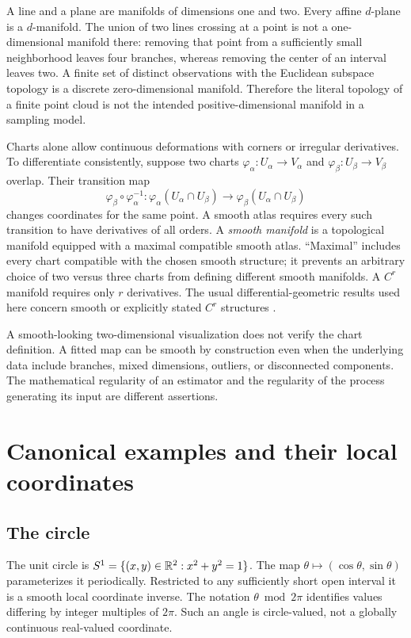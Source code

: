\begin{example}
A line and a plane are manifolds of dimensions one and two. Every affine $d$-plane is a $d$-manifold. The union of two lines crossing at a point is not a one-dimensional manifold there: removing that point from a sufficiently small neighborhood leaves four branches, whereas removing the center of an interval leaves two. A finite set of distinct observations with the Euclidean subspace topology is a discrete zero-dimensional manifold. Therefore the literal topology of a finite point cloud is not the intended positive-dimensional manifold in a sampling model.
\end{example}

Charts alone allow continuous deformations with corners or irregular derivatives. To differentiate consistently, suppose two charts $\varphi_\alpha:U_\alpha\to V_\alpha$ and $\varphi_\beta:U_\beta\to V_\beta$ overlap. Their transition map
\begin{equation}
\varphi_\beta\circ\varphi_\alpha^{-1}:
\varphi_\alpha(U_\alpha\cap U_\beta)\longrightarrow
\varphi_\beta(U_\alpha\cap U_\beta)
\end{equation}
changes coordinates for the same point. A smooth atlas requires every such transition to have derivatives of all orders. A \emph{smooth manifold} is a topological manifold equipped with a maximal compatible smooth atlas. ``Maximal'' includes every chart compatible with the chosen smooth structure; it prevents an arbitrary choice of two versus three charts from defining different smooth manifolds. A $C^r$ manifold requires only $r$ derivatives. The usual differential-geometric results used here concern smooth or explicitly stated $C^r$ structures \citep{lee2012}.

\begin{misconception}
A smooth-looking two-dimensional visualization does not verify the chart definition. A fitted map can be smooth by construction even when the underlying data include branches, mixed dimensions, outliers, or disconnected components. The mathematical regularity of an estimator and the regularity of the process generating its input are different assertions.
\end{misconception}

\section{Canonical examples and their local coordinates}
\subsection{The circle}
The unit circle is $S^1=\{(x,y)\in\mathbb{R}^2:x^2+y^2=1\}$. The map $\theta\mapsto(\cos\theta,\sin\theta)$ parameterizes it periodically. Restricted to any sufficiently short open interval it is a smooth local coordinate inverse. The notation $\theta\bmod 2\pi$ identifies values differing by integer multiples of $2\pi$. Such an angle is circle-valued, not a globally continuous real-valued coordinate.

